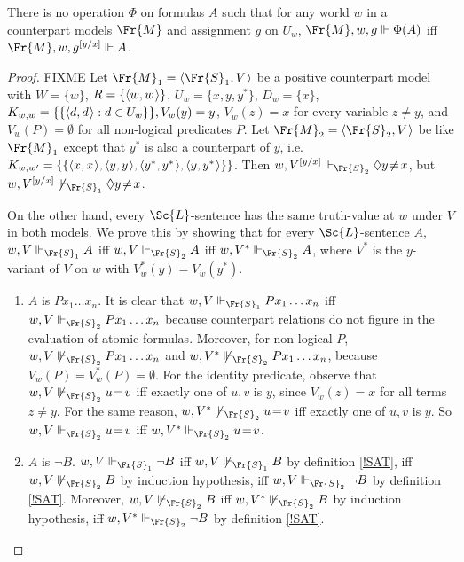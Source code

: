 \documentclass[11pt]{woarticle}
\theoremstyle{break}
\theoremstyle{nonumberplain}
\newcommand{\SAT}{\Vdash}
\newcommand{\1}{\;\,|\;\,}
\renewcommand{\t}[1]{\ensuremath{\langle #1  \makebox[.2ex]{}\rangle}}
\begin{document}
\begin{theorem}\label{non-elim}
  There is no operation $\Phi$ on formulas $A$ such that for any world $w$ in a
  counterpart models $\Fr{M}$ and assignment $g$ on $U_{w}$,
  $\Fr{M},w,g \SAT \Phi(A)$ iff $\Fr{M},w,g^{[y/x]} \SAT A$.
\end{theorem}
\begin{proof}
  FIXME
  Let $\Fr{M}_1 = \t{\Fr{S}_1,V}$ be a positive counterpart model with
  $W = \{w\}$, $R = \{ \t{w,w} \}$, $U_w = \{ x,y,y^* \}$, $D_w = \{ x
  \}$, $K_{w,w} = \{ \{ \t{d,d} : d \in U_w \} \}, V_w(y) = y$,
  $V_w(z) = x$ for every variable $z \not= y$, and $V_w(P) =
  \emptyset$ for all non-logical predicates $P$. Let $\Fr{M}_2 =
  \t{\Fr{S}_2,V}$ be like $\Fr{M}_1$ except that $y^*$ is also a
  counterpart of $y$, i.e. $K_{w,w'} = \{\{ \t{x,x}, \t{y,y},
  \t{y^*,y^*}, \t{y,y^*} \} \}$. Then $w,V^{[y/x]} \SAT_{\Fr{S}_2}
  \Diamond y\!\not=\!x$, but $w,V^{[y/x]} \not\SAT_{\Fr{S}_1} \Diamond
  y\!\not=\!x$.
 
  On the other hand, every $\Sc{L}$-sentence has the same truth-value
  at $w$ under $V$ in both models. We prove this by showing that for
  every $\Sc{L}$-sentence $A$, $w,V \SAT_{\Fr{S}_1} A$ iff $w,V
  \SAT_{\Fr{S}_2} A$ iff $w,V^* \SAT_{\Fr{S}_2} A$, where $V^*$ is the
  $y$-variant of $V$ on $w$ with $V^*_w(y)=V_w(y^*)$.

  \begin{enumerate}

  \item $A$ is $Px_1\ldots x_n$.\; It is clear that $w,V
    \SAT_{\Fr{S}_1} Px_1\ldots x_n$ iff $w,V \SAT_{\Fr{S}_2}
    Px_1\ldots x_n$ because counterpart relations do not figure
    in the evaluation of atomic formulas. Moreover, for non-logical
    $P$, $w,V \not\SAT_{\Fr{S}_2} Px_1\ldots x_n$ and $w,V^*
    \not\SAT_{\Fr{S}_2} Px_1\ldots x_n$, because $V_w(P) = V^*_w(P) =
    \emptyset$. For the identity predicate, observe that $w,V
    \not\SAT_{\Fr{S}_2} u\!=\!v$ iff exactly one of $u,v$ is $y$,
    since $V_w(z) = x$ for all terms $z \not= y$. For the same reason,
    $w,V^* \not\SAT_{\Fr{S}_2} u\!=\!v$ iff exactly one of $u,v$ is
    $y$. So $w,V \SAT_{\Fr{S}_2} u\!=\!v$ iff $w,V^* \SAT_{\Fr{S}_2}
    u\!=\!v$.
    
  \item $A$ is $\neg B$.\; $w,V \SAT_{\Fr{S}_1} \neg B$ iff $w,V
    \not\SAT_{\Fr{S}_1} B$ by definition \ref{!SAT}, iff $w,V
    \not\SAT_{\Fr{S}_2} B$ by induction hypothesis, iff $w,V
    \SAT_{\Fr{S}_2} \neg B$ by definition \ref{!SAT}. Moreover, $w,V
    \not\SAT_{\Fr{S}_2} B$ iff $w,V^* \not\SAT_{\Fr{S}_2} B$ by
    induction hypothesis, iff $w,V^* \SAT_{\Fr{S}_2} \neg B$ by
    definition \ref{!SAT}.


\end{enumerate}
\end{proof}
\end{document}
